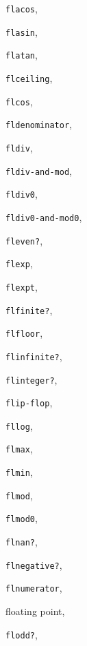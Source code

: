 {\begin{multicols}{2}
\texttt{flacos}, \textit{\pageref{objects_s195}}
  
\texttt{flasin}, \textit{\pageref{objects_s195}}
  
\texttt{flatan}, \textit{\pageref{objects_s195}}
  
\texttt{flceiling}, \textit{\pageref{objects_s190}}
  
\texttt{flcos}, \textit{\pageref{objects_s194}}
  
\texttt{fldenominator}, \textit{\pageref{objects_s191}}
  
\texttt{fldiv}, \textit{\pageref{objects_s188}}
  
\texttt{fldiv-and-mod}, \textit{\pageref{objects_s188}}
  
\texttt{fldiv0}, \textit{\pageref{objects_s189}}
  
\texttt{fldiv0-and-mod0}, \textit{\pageref{objects_s189}}
  
\texttt{fleven?}, \textit{\pageref{objects_s182}}
  
\texttt{flexp}, \textit{\pageref{objects_s193}}
  
\texttt{flexpt}, \textit{\pageref{objects_s197}}
  
\texttt{flfinite?}, \textit{\pageref{objects_s181}}
  
\texttt{flfloor}, \textit{\pageref{objects_s190}}
  
\texttt{flinfinite?}, \textit{\pageref{objects_s181}}
  
\texttt{flinteger?}, \textit{\pageref{objects_s180}}
  
\texttt{flip-flop}, \pageref{binding_s31}
  
\texttt{fllog}, \textit{\pageref{objects_s193}}
  
\texttt{flmax}, \textit{\pageref{objects_s183}}
  
\texttt{flmin}, \textit{\pageref{objects_s183}}
  
\texttt{flmod}, \textit{\pageref{objects_s188}}
  
\texttt{flmod0}, \textit{\pageref{objects_s189}}
  
\texttt{flnan?}, \textit{\pageref{objects_s181}}
  
\texttt{flnegative?}, \textit{\pageref{objects_s179}}
  
\texttt{flnumerator}, \textit{\pageref{objects_s191}}
  
floating
point, \pageref{objects_s77}
  
\texttt{flodd?}, \textit{\pageref{objects_s182}}
  

\end{multicols}}
